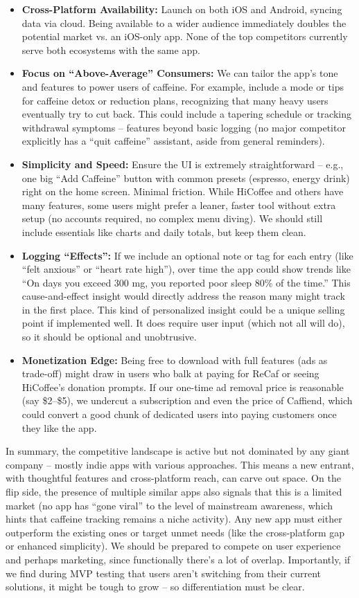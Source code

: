 \documentclass{article}
\begin{document}
\begin{itemize}
    \item \textbf{Cross-Platform Availability:} Launch on both iOS and Android, syncing data via cloud. Being available to a wider audience immediately doubles the potential market vs. an iOS-only app. None of the top competitors currently serve both ecosystems with the same app.
    \item \textbf{Focus on “Above-Average” Consumers:} We can tailor the app’s tone and features to power users of caffeine. For example, include a mode or tips for caffeine detox or reduction plans, recognizing that many heavy users eventually try to cut back. This could include a tapering schedule or tracking withdrawal symptoms – features beyond basic logging (no major competitor explicitly has a “quit caffeine” assistant, aside from general reminders).
    \item \textbf{Simplicity and Speed:} Ensure the UI is extremely straightforward – e.g., one big “Add Caffeine” button with common presets (espresso, energy drink) right on the home screen. Minimal friction. While HiCoffee and others have many features, some users might prefer a leaner, faster tool without extra setup (no accounts required, no complex menu diving). We should still include essentials like charts and daily totals, but keep them clean.
    \item \textbf{Logging “Effects”:} If we include an optional note or tag for each entry (like “felt anxious” or “heart rate high”), over time the app could show trends like “On days you exceed 300 mg, you reported poor sleep 80\% of the time.” This cause-and-effect insight would directly address the reason many might track in the first place. This kind of personalized insight could be a unique selling point if implemented well. It does require user input (which not all will do), so it should be optional and unobtrusive.
    \item \textbf{Monetization Edge:} Being free to download with full features (ads as trade-off) might draw in users who balk at paying for ReCaf or seeing HiCoffee’s donation prompts. If our one-time ad removal price is reasonable (say \$2–\$5), we undercut a subscription and even the price of Caffiend, which could convert a good chunk of dedicated users into paying customers once they like the app.
\end{itemize}

In summary, the competitive landscape is active but not dominated by any giant company – mostly indie apps with various approaches. This means a new entrant, with thoughtful features and cross-platform reach, can carve out space. On the flip side, the presence of multiple similar apps also signals that this is a limited market (no app has “gone viral” to the level of mainstream awareness, which hints that caffeine tracking remains a niche activity). Any new app must either outperform the existing ones or target unmet needs (like the cross-platform gap or enhanced simplicity). We should be prepared to compete on user experience and perhaps marketing, since functionally there’s a lot of overlap. Importantly, if we find during MVP testing that users aren’t switching from their current solutions, it might be tough to grow – so differentiation must be clear.
\end{document}
